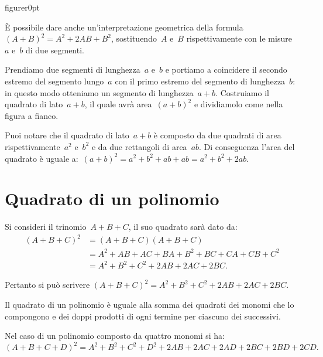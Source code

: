 \begin{wrapfloat}{figure}{r}{0pt}
 
\end{wrapfloat}

È possibile dare anche
un'interpretazione geometrica della formula~$\left(A+B\right)^{2}=A^{2}+2{AB}+B^{2}$,
sostituendo~$A$ e~$B$ rispettivamente con le misure~$a$ e~$b$
di due segmenti.

Prendiamo due segmenti di lunghezza~$a$ e~$b$ e portiamo a
coincidere il secondo estremo del segmento lungo~$a$ con il
primo estremo del segmento di lunghezza~$b$: in questo modo
otteniamo un segmento di lunghezza~$a+b$. Costruiamo il quadrato di
lato~$a+b$, il quale avrà area~$(a+b)^{2}$ e dividiamolo come
nella figura a fianco.

Puoi notare che il quadrato di lato~$a+b$ è composto da due quadrati
di area rispettivamente~$a^{2}$ e~$b^{2}$ e
da due rettangoli di area~$ab$. Di conseguenza
l'area del quadrato è uguale a:~$(a+b)^{2}=a^{2}+b^{2}+{ab}+{ab}=a^{2}+b^{2}+2{ab}$.

\vspazio\ovalbox{\risolvii \ref{ese:11.1}, \ref{ese:11.2}, \ref{ese:11.3}, \ref{ese:11.4}, \ref{ese:11.5}, \ref{ese:11.6}, \ref{ese:11.7}, \ref{ese:11.8}, \ref{ese:11.9}, \ref{ese:11.10}}

\section{Quadrato di un polinomio}\label{sect:quadrato_di_un_polinomio}

Si consideri il trinomio~$A+B+C$, il suo quadrato sarà dato da:
\begin{align*}
\left(A+B+C\right)^{2}&=\left(A+B+C\right)\left(A+B+C\right)\\
&=A^{2}+{AB}+{AC}+{BA}+B^{2}+{BC}+{CA}+{CB}+C^{2}\\
&=A^{2}+B^{2}+C^{2}+2{AB}+2{AC}+2{BC}.
\end{align*}

Pertanto si può scrivere $\left(A+B+C\right)^{2}=A^{2}+B^{2}+C^{2}+2{AB}+2{AC}+2{BC}$.

\osservazione Il quadrato di un polinomio è uguale alla somma
dei quadrati dei monomi che lo compongono e dei doppi prodotti di ogni
termine per ciascuno dei successivi.

Nel caso di un polinomio composto da quattro monomi si ha:
\[\left(A+B+C+D\right)^{2}=A^{2}+B^{2}+C^{2}+D^{2}+2{AB}+2{AC}+2{AD}+2{BC}+2{BD}+2{CD}.\]

